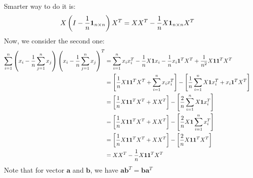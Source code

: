 Smarter way to do it is:
\begin{equation*}
    X\left( I - \frac{1}{n}\boldsymbol 1_{n\times n} \right)X^T = XX^T - \frac{1}{n}X\boldsymbol{1}_{n\times n}X^T
\end{equation*}
Now, we consider the second one:
\begin{equation*}
\begin{aligned}
    \sum^n_{i=1}\left( x_i-\frac{1}{n}\sum^n_{j=1}x_j \right)\left( x_i-\frac{1}{n}\sum^n_{j=1}x_j \right)^T &= \sum^n_{i=1} x_ix_i^T - \frac{1}{n}X\boldsymbol{1}x_i - \frac{1}{n} x_i\boldsymbol{1}^TX^T + \frac{1}{n^2}X\boldsymbol{1}\boldsymbol{1}^TX^T \\
    &= \left[ \frac{1}{n}X\boldsymbol{1}\boldsymbol{1}^TX^T + \sum^n_{i=1}x_ix_i^T \right] - \left[ \frac{1}{n}\sum^n_{i=1}X\boldsymbol{1}x_i^T + x_i\boldsymbol{1}^TX^T \right] \\
    &= \left[ \frac{1}{n}X\boldsymbol{1}\boldsymbol{1}^TX^T + XX^T \right] - \left[ \frac{2}{n}\sum^n_{i=1}X\boldsymbol{1}x_i^T \right] \\
    &= \left[ \frac{1}{n}X\boldsymbol{1}\boldsymbol{1}^TX^T + XX^T \right] - \left[ \frac{2}{n}X\boldsymbol{1}\sum^n_{i=1}x_i^T \right] \\
    &= \left[ \frac{1}{n}X\boldsymbol{1}\boldsymbol{1}^TX^T + XX^T \right] - \left[ \frac{2}{n}X\boldsymbol{1}\boldsymbol{1}^TX^T \right] \\
    &= XX^T - \frac{1}{n}X\boldsymbol{1}\boldsymbol{1}^TX^T\\
\end{aligned}
\end{equation*}
Note that for vector $\boldsymbol{a}$ and $\boldsymbol{b}$, we have $\boldsymbol{a}\boldsymbol{b}^T = \boldsymbol{b}\boldsymbol{a}^T$

